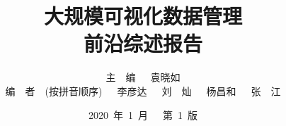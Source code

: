 \documentclass[12pt]{article}
\title{大规模可视化数据管理 \\ 前沿综述报告}
\author{主\ \ 编\ \ \ 袁晓如 \\ 编\ \ 者\ \ (按拼音顺序)\ \ \ 李彦达\ \ \ 刘\ \ 灿\ \ \ 杨昌和\ \ \ 张\ \ 江}
\date{2020\ 年\ 1\ 月\ \ \ 第\ 1\ 版}
\begin{document}
\begin{spacing}{1.5}
\begin{CJK*}{UTF8}{gbsn}
\renewcommand{\refname}{参考文献}



\clearpage
\maketitle

\clearpage
\tableofcontents

\clearpage

\clearpage

\clearpage

\clearpage

\clearpage

\clearpage

\printbibliography[heading = bibintoc]
% 
% 

\end{CJK*}
\end{spacing}
\end{document}
